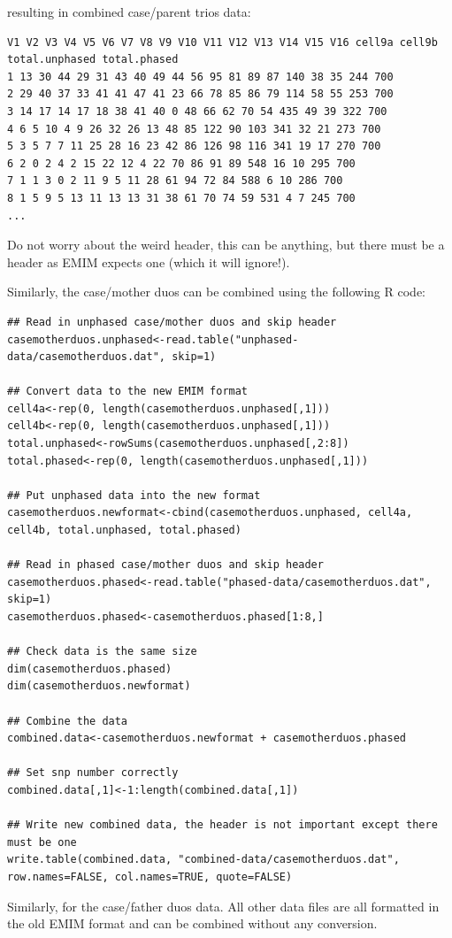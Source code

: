 \documentclass[a4paper,12pt]{article}
\begin{document}
resulting in combined case/parent trios data: 
\vspace{0.35cm} \begin{lstlisting}
V1 V2 V3 V4 V5 V6 V7 V8 V9 V10 V11 V12 V13 V14 V15 V16 cell9a cell9b total.unphased total.phased
1 13 30 44 29 31 43 40 49 44 56 95 81 89 87 140 38 35 244 700
2 29 40 37 33 41 41 47 41 23 66 78 85 86 79 114 58 55 253 700
3 14 17 14 17 18 38 41 40 0 48 66 62 70 54 435 49 39 322 700
4 6 5 10 4 9 26 32 26 13 48 85 122 90 103 341 32 21 273 700
5 3 5 7 7 11 25 28 16 23 42 86 126 98 116 341 19 17 270 700
6 2 0 2 4 2 15 22 12 4 22 70 86 91 89 548 16 10 295 700
7 1 1 3 0 2 11 9 5 11 28 61 94 72 84 588 6 10 286 700
8 1 5 9 5 13 11 13 13 31 38 61 70 74 59 531 4 7 245 700
...

\end{lstlisting} \vspace{0.35cm}
Do not worry about the weird header, this can be anything, but there must be a header as EMIM expects one (which it will ignore!). 

Similarly, the case/mother duos can be combined using the following R code: 
\vspace{0.35cm} \begin{lstlisting}
## Read in unphased case/mother duos and skip header
casemotherduos.unphased<-read.table("unphased-data/casemotherduos.dat", skip=1)

## Convert data to the new EMIM format
cell4a<-rep(0, length(casemotherduos.unphased[,1]))
cell4b<-rep(0, length(casemotherduos.unphased[,1]))
total.unphased<-rowSums(casemotherduos.unphased[,2:8])
total.phased<-rep(0, length(casemotherduos.unphased[,1]))

## Put unphased data into the new format
casemotherduos.newformat<-cbind(casemotherduos.unphased, cell4a, cell4b, total.unphased, total.phased) 

## Read in phased case/mother duos and skip header
casemotherduos.phased<-read.table("phased-data/casemotherduos.dat", skip=1)
casemotherduos.phased<-casemotherduos.phased[1:8,]

## Check data is the same size
dim(casemotherduos.phased)
dim(casemotherduos.newformat)

## Combine the data
combined.data<-casemotherduos.newformat + casemotherduos.phased

## Set snp number correctly
combined.data[,1]<-1:length(combined.data[,1])

## Write new combined data, the header is not important except there must be one
write.table(combined.data, "combined-data/casemotherduos.dat", row.names=FALSE, col.names=TRUE, quote=FALSE)

\end{lstlisting} \vspace{0.35cm}
Similarly, for the case/father duos data. All other data files are all formatted in the old EMIM format and can be combined without any conversion. 
\end{document}
